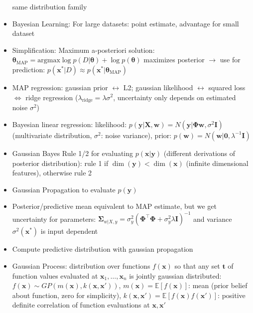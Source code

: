 \documentclass[11pt]{scrartcl}
\begin{document}
\begin{itemize}
        same distribution family
    \item Bayesian Learning: For large datasets: point estimate, advantage for small dataset
    \item Simplification: Maximum a-posteriori solution: \( \bm{\theta}_\mathrm{MAP} = 
        \mathrm{argmax} \log p ( D | \bm{\theta} ) + \log p ( \bm{\theta} ) \) maximizes 
        posterior \( \rightarrow \) use for prediction: \( p ( \bm{x}^* | D ) \approx 
        p ( \bm{x}^* | \bm{\theta}_\mathrm{MAP} ) \)
    \item MAP regression: gaussian prior \( \leftrightarrow \) L2; gaussian likelihood 
        \( \leftrightarrow \) squared loss \( \Leftrightarrow \) ridge regression 
        (\( \lambda_\mathrm{ridge} = \lambda \sigma^2 \), uncertainty only depends on estimated 
        noise \( \sigma^2 \))
    \item Bayesian linear regression: likelihood: \( p ( \bm{y} | \bm{X}, \bm{w} ) = 
        N ( \bm{y} | \bm{\Phi w}, \sigma^2 \bm{I} ) \) (multivariate distribution, 
        \( \sigma^2 \): noise variance), prior: \( p ( \bm{w} ) = 
        N ( \bm{w} | \bm{0}, \lambda^{- 1} \bm{I} ) \)
    \item Gaussian Bayes Rule 1/2 for evaluating \( p ( \bm{x} | \bm{y} ) \) (different derivations of posterior distribution): rule 1 if 
        \( \dim ( \bm{y} ) < \dim ( \bm{x} ) \) (infinite dimensional features), otherwise rule 
        2
    \item Gaussian Propagation to evaluate \( p ( \bm{y} ) \)
    \item Posterior/predictive mean equivalent to MAP estimate, but we get uncertainty for 
        parameters: \( \bm{\Sigma}_{w | X, y} = 
        \sigma_y^2 ( \bm{\Phi}^\top \bm{\Phi} + \sigma_y^2 \lambda \bm{I} )^{- 1} \) and 
        variance \( \sigma^2 ( \bm{x}^* ) \) is input dependent
    \item Compute predictive distribution with gaussian propagation
    \item Gaussian Process: distribution over functions \( f ( \bm{x} ) \) so that any set
        \( \bm{t} \) of function values evaluated at \( \bm{x}_1, \dots, \bm{x}_n \) is 
        jointly gaussian distributed: \( f ( \bm{x} ) \sim GP ( m ( \bm{x} ), 
        k ( \bm{x}, \bm{x}' ) ) \), \( m ( \bm{x} ) = \mathbb{E} [ f ( \bm{x} ) ] \): mean  
        (prior belief about function, zero for simplicity), \( k ( \bm{x}, \bm{x}' ) = 
        \mathbb{E} [ f ( \bm{x} ) f ( \bm{x}' ) ] \): positive definite correlation of 
        function evaluations at \( \bm{x}, \bm{x}' \)

\end{itemize}
\end{document}
